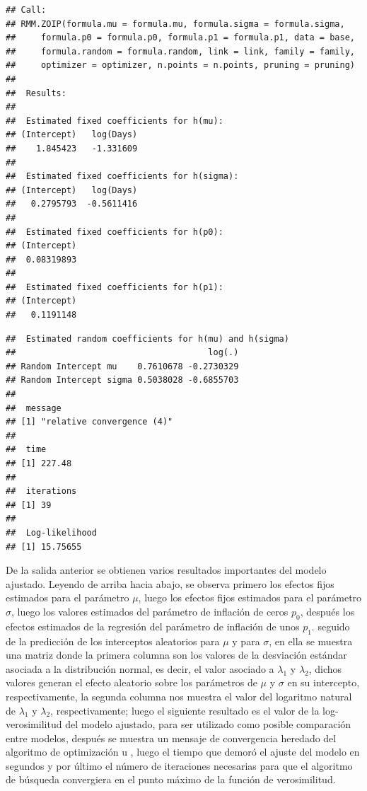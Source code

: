 \begin{verbatim}
## Call:
## RMM.ZOIP(formula.mu = formula.mu, formula.sigma = formula.sigma, 
##     formula.p0 = formula.p0, formula.p1 = formula.p1, data = base, 
##     formula.random = formula.random, link = link, family = family, 
##     optimizer = optimizer, n.points = n.points, pruning = pruning)
## 
##  Results: 
## 
##  Estimated fixed coefficients for h(mu): 
## (Intercept)   log(Days) 
##    1.845423   -1.331609 
## 
##  Estimated fixed coefficients for h(sigma): 
## (Intercept)   log(Days) 
##   0.2795793  -0.5611416 
## 
##  Estimated fixed coefficients for h(p0): 
## (Intercept) 
##  0.08319893 
## 
##  Estimated fixed coefficients for h(p1): 
## (Intercept) 
##   0.1191148 
\end{verbatim}
\begin{verbatim}
##  Estimated random coefficients for h(mu) and h(sigma) 
##                                      log(.)
## Random Intercept mu    0.7610678 -0.2730329
## Random Intercept sigma 0.5038028 -0.6855703
## 
##  message 
## [1] "relative convergence (4)"
## 
##  time 
## [1] 227.48
## 
##  iterations 
## [1] 39
## 
##  Log-likelihood 
## [1] 15.75655
\end{verbatim}

De la salida anterior se obtienen varios resultados importantes del modelo ajustado. Leyendo de arriba hacia abajo, se observa primero los efectos fijos estimados para el par\'{a}metro $\mu$, luego los efectos fijos estimados para el par\'{a}metro $\sigma$, luego los valores estimados del par\'{a}metro de inflaci\'{o}n de ceros $p_0$, despu\'{e}s los efectos estimados de la regresi\'{o}n del par\'{a}metro de inflaci\'{o}n de unos $p_1$. seguido de la predicci\'{o}n de los interceptos aleatorios para $\mu$ y para $\sigma$, en ella se muestra una matriz donde la primera columna son los valores de la desviaci\'{o}n est\'{a}ndar asociada a la distribuci\'{o}n normal, es decir, el valor asociado a $\lambda_1$ y $\lambda_2$, dichos valores generan el efecto aleatorio sobre los par\'{a}metros de $\mu$ y $\sigma$ en su intercepto, respectivamente, la segunda columna nos muestra el valor del logaritmo natural de $\lambda_1$ y $\lambda_2$, respectivamente; luego el siguiente resultado es el valor de la log-verosimilitud del modelo ajustado, para ser utilizado como posible comparaci\'{o}n entre modelos, despu\'{e}s se muestra un mensaje de convergencia heredado del algoritmo de optimizaci\'{o}n  u , luego el tiempo que demor\'{o} el ajuste del modelo en segundos y por \'{u}ltimo el n\'{u}mero de iteraciones necesarias para que el algoritmo de b\'{u}squeda convergiera en el punto m\'{a}ximo de la funci\'{o}n de verosimilitud.\\

